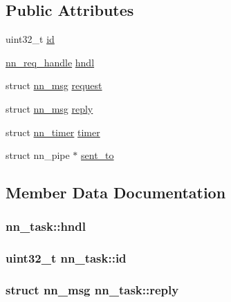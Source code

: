 \subsection*{Public Attributes}
\begin{DoxyCompactItemize}
\item 
uint32\+\_\+t \hyperlink{structnn__task_a61d4e6f7c317599f1a3e659df82c9919}{id}
\item 
\hyperlink{unionnn__req__handle}{nn\+\_\+req\+\_\+handle} \hyperlink{structnn__task_abc1d637c21b1afdea3f3474c6cbcfc03}{hndl}
\item 
struct \hyperlink{structnn__msg}{nn\+\_\+msg} \hyperlink{structnn__task_a0dab7513b2ff280027b3293dcd693655}{request}
\item 
struct \hyperlink{structnn__msg}{nn\+\_\+msg} \hyperlink{structnn__task_a835619341c3f9098c36f7da8ce7a27ee}{reply}
\item 
struct \hyperlink{structnn__timer}{nn\+\_\+timer} \hyperlink{structnn__task_a835b12a213008ea12a2075efc4180121}{timer}
\item 
struct nn\+\_\+pipe $\ast$ \hyperlink{structnn__task_af4a1558ae1fc15af8a1bda4fad2a31c8}{sent\+\_\+to}
\end{DoxyCompactItemize}


\subsection{Member Data Documentation}
\subsubsection[{hndl}]{ nn\+\_\+task\+::hndl}\hypertarget{structnn__task_abc1d637c21b1afdea3f3474c6cbcfc03}{}\label{structnn__task_abc1d637c21b1afdea3f3474c6cbcfc03}
\subsubsection[{id}]{\setlength{\rightskip}{0pt plus 5cm}uint32\+\_\+t nn\+\_\+task\+::id}\hypertarget{structnn__task_a61d4e6f7c317599f1a3e659df82c9919}{}\label{structnn__task_a61d4e6f7c317599f1a3e659df82c9919}
\subsubsection[{reply}]{\setlength{\rightskip}{0pt plus 5cm}struct {\bf nn\+\_\+msg} nn\+\_\+task\+::reply}\hypertarget{structnn__task_a835619341c3f9098c36f7da8ce7a27ee}{}\label{structnn__task_a835619341c3f9098c36f7da8ce7a27ee}
